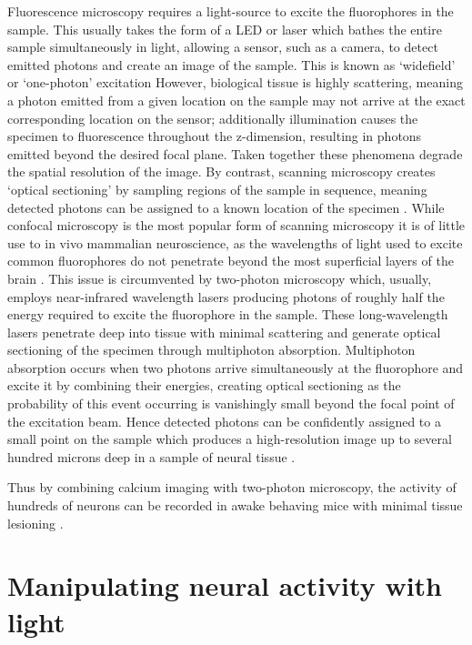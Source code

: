Fluorescence microscopy \cite{lichtman_fluorescence_2005} requires a light-source to excite the fluorophores in the sample. This usually takes the form of a LED or laser which bathes the entire sample simultaneously in light, allowing a sensor, such as a camera, to detect emitted photons and create an image of the sample. This is known as ‘widefield’ or ‘one-photon’ excitation However, biological tissue is highly scattering, meaning a photon emitted from a given location on the sample may not arrive at the exact corresponding location on the sensor; additionally illumination causes the specimen to fluorescence throughout the z-dimension, resulting in photons emitted beyond the desired focal plane. Taken together these phenomena degrade the spatial resolution of the image. By contrast, scanning microscopy creates ‘optical sectioning’ by sampling regions of the sample in sequence, meaning detected photons can be assigned to a known location of the specimen \cite{lichtman_fluorescence_2005}. While confocal microscopy \cite{nwaneshiudu_introduction_2012} is the most popular form of scanning microscopy it is of little use to in vivo mammalian neuroscience, as the wavelengths of light used to excite common fluorophores do not penetrate beyond the most superficial layers of the brain \cite{helmchen_deep_2005}. This issue is circumvented by two-photon microscopy which, usually, employs near-infrared wavelength lasers producing photons of roughly half the energy required to excite the fluorophore in the sample. These long-wavelength lasers penetrate deep into tissue with minimal scattering and generate optical sectioning of the specimen through multiphoton absorption. Multiphoton absorption occurs when two photons arrive simultaneously at the fluorophore and excite it by combining their energies, creating optical sectioning as the probability of this event occurring is vanishingly small beyond the focal point of the excitation beam. Hence detected photons can be confidently assigned to a small point on the sample which produces a high-resolution image up to several hundred microns deep in a sample of neural tissue \cite{helmchen_deep_2005}.

Thus by combining calcium imaging with two-photon microscopy, the activity of hundreds of neurons can be recorded in awake behaving mice with minimal tissue lesioning \cite{helmchen_vivo_1999, stosiek_vivo_2003, lutcke_steady_2013, driscoll_dynamic_2017, stringer_spontaneous_2019}.

\section{Manipulating neural activity with light}

